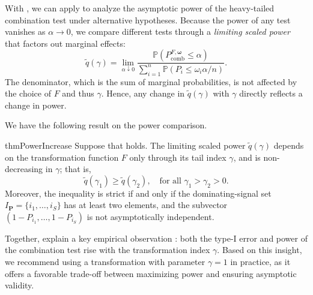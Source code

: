 \documentclass[12pt]{article}
\theoremstyle{plain}
\theoremstyle{plain}
\theoremstyle{definition}
\renewcommand{\Pr}{\mathbb{P}}
\begin{document}
With , we can apply  to analyze the asymptotic power of the heavy-tailed combination test under alternative hypotheses.
Because the power of any test vanishes as $\alpha \to 0$, we compare different tests through a \emph{limiting scaled power} that factors out marginal effects:
\begin{equation}
\label{eq:limiting-power-ratio}
\tilde{q}(\gamma)=\lim_{\alpha\downarrow0}\frac{\Pr\left(P_{\mathrm{comb}}^{F,\bm\omega}\le\alpha\right)}{\sum_{i=1}^n\Pr\left(P_i\le{\omega_i\alpha}/{n}\right)}.
\end{equation}
The denominator, which is the sum of marginal probabilities, is not affected by the choice of $F$ and thus $\gamma$. Hence, any change in $\tilde q(\gamma)$ with $\gamma$ directly reflects a change in power.

We have the following result on the power comparison. 
\begin{restatable}{thm}{PowerIncrease}
\label{thm:power-increasing}
Suppose that  holds. 
The limiting scaled power $\tilde{q}(\gamma)$  depends on the transformation function $F$ only through its tail index $\gamma$, and is non-decreasing in $\gamma$;  that is,
\[
\tilde{q}(\gamma_1) \geq \tilde{q}(\gamma_2), \quad \text{for all } \gamma_1 > \gamma_2 > 0.
\]
Moreover, the inequality is strict if and only if 
the dominating-signal set $I_{\mathbf P} = \{i_1,\dots, i_S\}$ has at least two elements, and
the subvector $(1-P_{i_1}, \dots, 1- P_{i_S})$ is not asymptotically independent. 
\end{restatable}


Together,  explain a key empirical observation \citep{gui2023aggregating}: both the type-I error and power of the combination test rise with the transformation index $\gamma$. %
Based on this insight, we recommend using a transformation with parameter $\gamma = 1$ in practice, as it offers a favorable trade-off between maximizing power and ensuring asymptotic validity.
\end{document}
